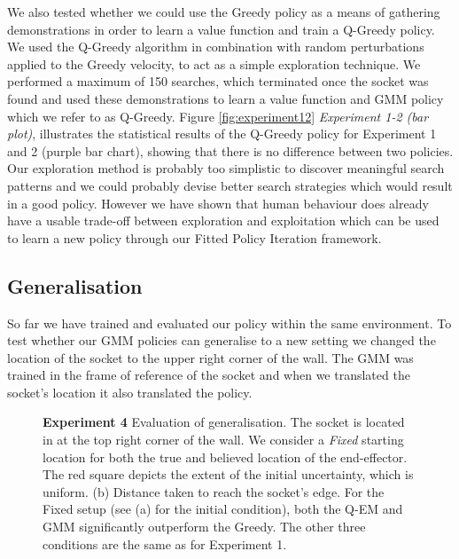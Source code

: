 \documentclass[final,3p,times,twocolumn]{elsarticle}
\begin{document}
We also tested whether we could use the Greedy policy as a means of gathering demonstrations in order to learn a value function and 
train a Q-Greedy policy. We used the Q-Greedy algorithm in combination with random perturbations applied to the Greedy velocity, to act as 
a simple exploration technique. We performed a maximum of 150 searches, which terminated once the socket was found and used these demonstrations to 
learn a value function and GMM policy which we refer to as Q-Greedy. Figure \ref{fig:experiment12} \textit{Experiment 1-2 (bar plot)}, illustrates the statistical results 
of the Q-Greedy policy for Experiment 1 and 2 (purple bar chart), showing that there is no difference between two policies. 
Our exploration method is probably too simplistic to discover meaningful search patterns and we could probably devise better 
search strategies which would result in a good policy. However we have shown that human behaviour does already have a usable trade-off 
between exploration and exploitation which can be used to learn a new policy through our Fitted Policy Iteration framework.

\subsection{Generalisation}

So far we have trained and evaluated our policy within the same environment.
To test whether our GMM policies can generalise to a new setting we changed the location of the 
socket to the upper right corner of the wall. The GMM was trained in the frame of reference of the socket and
when we translated the socket's location it also translated the policy. 

\begin{figure}
 \centering
    \caption{\textbf{Experiment 4} Evaluation of generalisation. The socket is located in at the top right corner of the wall. We consider a 
    \textit{Fixed} starting location for both the true and believed location of the end-effector. The red square depicts the 
    extent of the initial uncertainty, which is uniform. (b) Distance taken to reach the socket's edge. For the Fixed setup (see (a) for 
    the initial condition), both the Q-EM and GMM significantly outperform the Greedy. The other three conditions are the same as for 
    Experiment 1. }
    \label{fig:experiment4}
\end{figure}
\end{document}
